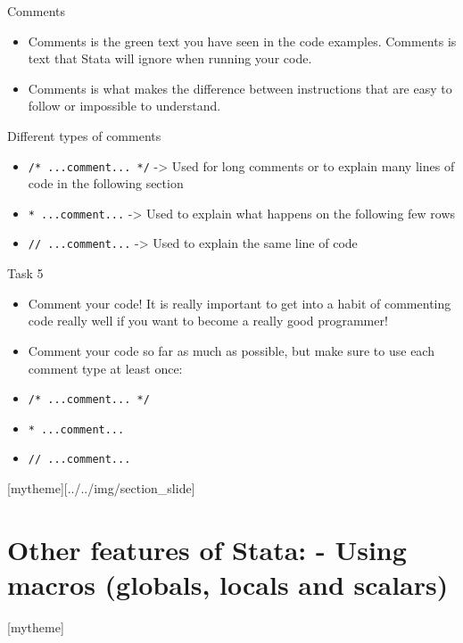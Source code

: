 \documentclass[aspectratio=169]{beamer}
\newcommand{\sectionpic}[2]{
	\setbeamertemplate{section page}[mytheme][#2]
	\section{#1}
	\setbeamertemplate{section page}[mytheme]
}
\begin{document}
\begin{frame}{Comments}
	\begin{itemize}
		\item Comments is the green text you have seen in the code examples. Comments is text that Stata will ignore when running your code.
		\item Comments is what makes the difference between instructions that are easy to follow or impossible to understand.
	\end{itemize}
\end{frame}

\begin{frame}{Different types of comments}
	\begin{itemize}
		\item \texttt{/* ...comment... */} -> Used for long comments or to explain many lines of code in the following section
		\item \texttt{* ...comment...} -> Used to explain what happens on the following few rows
		\item \texttt{// ...comment...} -> Used to explain the same line of code
	\end{itemize}
\end{frame}

\begin{frame}{Task 5}
	\begin{itemize}
		\item Comment your code! It is really important to get into a habit of commenting code really well if you want to become a really good programmer!
		\item Comment your code so far as much as possible, but make sure to use each comment type at least once:
	\end{itemize}
	\begin{itemize}
		\item \texttt{/* ...comment... */}
		\item \texttt{* ...comment...}
		\item \texttt{// ...comment...}
	\end{itemize}
\end{frame}


\sectionpic{Other features of Stata: - Using macros (globals, locals and scalars)}{../../img/section_slide}
\end{document}
